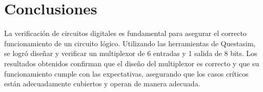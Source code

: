 \documentclass[9pt,technote]{IEEEtran}
\begin{document}
	\section*{Conclusiones}
	La verificación de circuitos digitales es fundamental para asegurar el correcto funcionamiento de un circuito lógico. Utilizando las herramientas de Questasim, se logró diseñar y verificar un multiplexor de 6 entradas y 1 salida de 8 bits. Los resultados obtenidos confirman que el diseño del multiplexor es correcto y que su funcionamiento cumple con las expectativas, asegurando que los casos críticos están adecuadamente cubiertos y operan de manera adecuada.	


	
	
	
	
	
\end{document}
